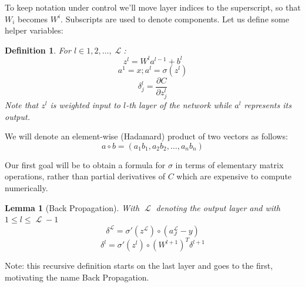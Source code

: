 \documentclass[a4paper]{article}
\theoremstyle{break}
\newtheorem{definition}{Definition}[section]
\newtheorem{lemma}[theorem]{Lemma}
\newcommand{\Part}[2]{\frac{\partial #1}{\partial #2}}
\DeclareMathOperator{\La}{\mathcal{L}}
\begin{document}
To keep notation under control we'll move layer indices to the superscript, so that $W_i$ becomes $ W^i $. Subscripts are used to denote components. Let us define some helper variables:
\begin{definition}\label{def:back_prop_helper}
For $ l \in {1, 2, \ldots, \La} $:
    $$ z^l = W^l a^{l-1} + b^{l} $$
    $$ a^1 = x; a^l = \sigma( z^l ) $$
    $$ \delta^l_j = \Part{C}{ z_j^l } $$
Note that $z^l$ is weighted input to $l$-th layer of the network while $a^l$ represents its output.
\end{definition}

We will denote an element-wise (Hadamard) product of two vectors as follows:
    \newcommand{\hadam}{\circ}
    $$ a \hadam b = (a_1 b_1, a_2 b_2, \ldots, a_n b_n)$$

Our first goal will be to obtain a formula for $\sigma$ in terms of elementary matrix operations, rather than partial derivatives of $C$ which are expensive to compute numerically.

\begin{lemma}[Back Propagation]\label{lem:back_propagation}
With $\La$ denoting the output layer and with $ 1 \leq l \leq \La - 1$ 
\begin{equation}\label{eq:last_sigma}
   \delta^{\La} = \sigma'(z^{\La}) \hadam (a_J^{\La} - y ) 
\end{equation}
\begin{equation}\label{eq:previous_sigma}
    \delta^l = \sigma'(z^l) \hadam (W^{l+1})^T \delta^{l+1}
\end{equation}
\end{lemma}

Note: this recursive definition starts on the last layer and goes to the first, motivating the name Back Propagation.
\end{document}
